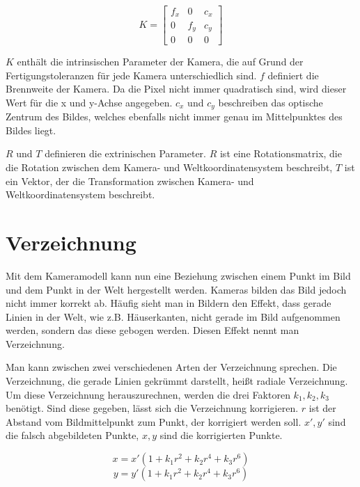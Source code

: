 \begin{equation}
  K = 
  \begin{bmatrix}
  	f_x & 0 & c_x \\
  	0 & f_y & c_y \\
  	0 & 0 & 0
  \end{bmatrix}
\end{equation}

$K$ enthält die intrinsischen Parameter der Kamera, die auf Grund der Fertigungstoleranzen für jede Kamera unterschiedlich sind. $f$ definiert die Brennweite der Kamera. Da die Pixel nicht immer quadratisch sind, wird dieser Wert für die x und y-Achse angegeben. $c_x$ und $c_y$ beschreiben das optische Zentrum des Bildes, welches ebenfalls nicht immer genau im Mittelpunktes des Bildes liegt.

$R$ und $T$ definieren die extrinischen Parameter. $R$ ist eine Rotationsmatrix, die die Rotation zwischen dem Kamera- und Weltkoordinatensystem beschreibt, $T$ ist ein Vektor, der die Transformation zwischen Kamera- und Weltkoordinatensystem beschreibt.

\section{Verzeichnung} %
\label{sec:verzeichnung}
Mit dem Kameramodell kann nun eine Beziehung zwischen einem Punkt im Bild und dem Punkt in der Welt hergestellt werden. Kameras bilden das Bild jedoch nicht immer korrekt ab. Häufig sieht man in Bildern den Effekt, dass gerade Linien in der Welt, wie z.B. Häuserkanten, nicht gerade im Bild aufgenommen werden, sondern das diese gebogen werden. Diesen Effekt nennt man Verzeichnung.

Man kann zwischen zwei verschiedenen Arten der Verzeichnung sprechen. Die Verzeichnung, die gerade Linien gekrümmt darstellt, heißt radiale Verzeichnung. Um diese Verzeichnung herauszurechnen, werden die drei Faktoren $k_1, k_2, k_3$ benötigt. Sind diese gegeben, lässt sich die Verzeichnung korrigieren. $r$ ist der Abstand vom Bildmittelpunkt zum Punkt, der korrigiert werden soll. $x', y'$ sind die falsch abgebildeten Punkte, $x,y$ sind die korrigierten Punkte.

\begin{equation}
	x = x'(1 + k_1 r^2 + k_2 r^4 + k_3 r^6)
\end{equation}
\begin{equation}
	y = y'(1 + k_1 r^2 + k_2 r^4 + k_3 r^6)
\end{equation}

